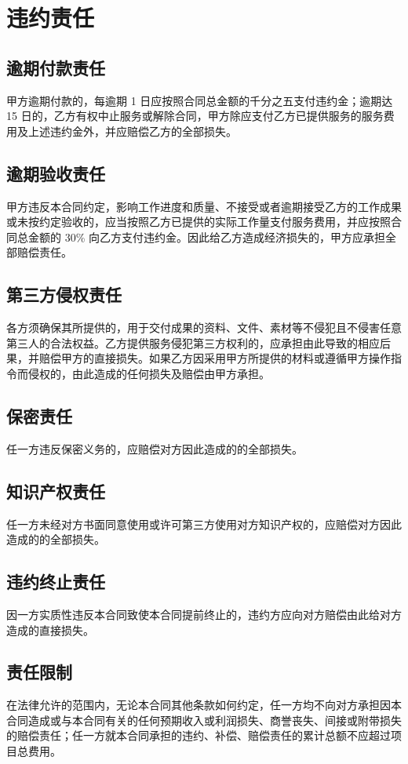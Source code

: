 \section{违约责任}

\subsection{逾期付款责任}
甲方逾期付款的，每逾期 1 日应按照合同总金额的千分之五支付违约金；逾期达 15 日的，乙方有权中止服务或解除合同，甲方除应支付乙方已提供服务的服务费用及上述违约金外，并应赔偿乙方的全部损失。

\subsection{逾期验收责任}
甲方违反本合同约定，影响工作进度和质量、不接受或者逾期接受乙方的工作成果或未按约定验收的，应当按照乙方已提供的实际工作量支付服务费用，并应按照合同总金额的 30\% 向乙方支付违约金。因此给乙方造成经济损失的，甲方应承担全部赔偿责任。

\subsection{第三方侵权责任}
各方须确保其所提供的，用于交付成果的资料、文件、素材等不侵犯且不侵害任意第三人的合法权益。乙方提供服务侵犯第三方权利的，应承担由此导致的相应后果，并赔偿甲方的直接损失。如果乙方因采用甲方所提供的材料或遵循甲方操作指令而侵权的，由此造成的任何损失及赔偿由甲方承担。

\subsection{保密责任}
任一方违反保密义务的，应赔偿对方因此造成的的全部损失。

\subsection{知识产权责任}
任一方未经对方书面同意使用或许可第三方使用对方知识产权的，应赔偿对方因此造成的的全部损失。

\subsection{违约终止责任}
因一方实质性违反本合同致使本合同提前终止的，违约方应向对方赔偿由此给对方造成的直接损失。

\subsection{责任限制}
在法律允许的范围内，无论本合同其他条款如何约定，任一方均不向对方承担因本合同造成或与本合同有关的任何预期收入或利润损失、商誉丧失、间接或附带损失的赔偿责任；任一方就本合同承担的违约、补偿、赔偿责任的累计总额不应超过项目总费用。
